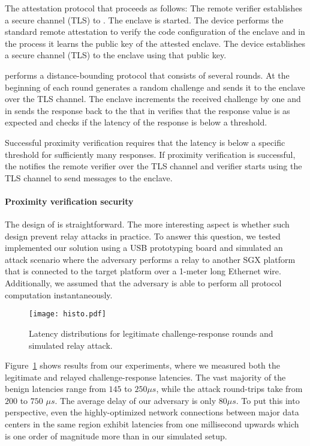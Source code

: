 The \proximitee attestation protocol that proceeds as follows: \one The remote verifier establishes a secure channel (TLS) to \key. \two The enclave is started. \three The \key device performs the standard remote attestation to verify the code configuration of the enclave and in the process it learns the public key of the attested enclave. \four The \key device establishes a secure channel (TLS) to the enclave using that public key. 

\five \key performs a distance-bounding protocol that consists of several rounds. At the beginning of each round \key generates a random challenge and sends it to the enclave over the TLS channel. \six The enclave increments the received challenge by one and in \seven sends the response back to the \key that in \eight verifies that the response value is as expected and checks if the latency of the response is below a threshold. 

\nine Successful proximity verification requires that the latency is below a specific threshold for sufficiently many responses. If proximity verification is successful, the \key notifies the remote verifier over the TLS channel and verifier starts using the \key TLS channel to send messages to the enclave.

\paragraph{Proximity verification security} The design of \proximitee is straightforward. The more interesting aspect is whether such design prevent relay attacks in practice. To answer this question, we tested implemented our solution using a USB prototyping board and simulated an attack scenario where the adversary performs a relay to another SGX platform that is connected to the target platform over a 1-meter long Ethernet wire. Additionally, we assumed that the adversary is able to perform all protocol computation instantaneously. 

\begin{figure}[t]
  \centering
    \texttt{[image: histo.pdf]} 
    \caption{Latency distributions for legitimate challenge-response rounds and simulated relay attack.}
    \label{graph:histogram}
\end{figure}

Figure~\ref{graph:histogram} shows results from our experiments, where we measured both the legitimate and relayed challenge-response latencies. The vast majority of the benign latencies range from $145$ to $250 \mu s$, while the attack round-trips take from $200$ to $750$ $\mu s$. The average delay of our adversary is only $80 \mu s$. To put this into perspective, even the highly-optimized network connections between major data centers in the same region exhibit latencies from one millisecond upwards which is one order of magnitude more than in our simulated setup. 

